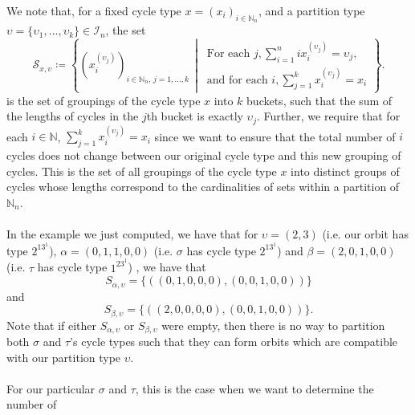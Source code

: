 We note that, for a fixed cycle type \( x = (x_i)_{i \in
\mathbb{N}_n} \), and a partition type $\upsilon =
\{\upsilon_1,\dots, \upsilon_k\}\in\mathcal{I}_n$, the set
\[
  \mathcal{S}_{x,\upsilon} \coloneqq \left\{
    \left(x^{(\upsilon_j)}_i\right)_{i \in \mathbb{N}_n,\, j =
    1,\dots,k} \,\middle|\,
    \begin{array}{l}
      \text{For each } j, \sum_{i=1}^n i x^{(\upsilon_j)}_i = \upsilon_j, \\
      \text{and for each } i, \sum_{j=1}^k x^{(\upsilon_j)}_i = x_i
    \end{array}
  \right\}.
\] is the set of groupings of the cycle type $x$ into $k$ buckets,
such that the sum of the lengths of cycles in the $j$th bucket is
exactly $\upsilon_j$.
Further, we require that for each $i\in\mathbb{N}$, $\sum_{j=1}^k
x^{(\upsilon_j)}_i = x_i$ since we want to ensure that the total number
of $i$ cycles does not change between our original cycle type and
this new grouping of cycles. This is the set of all groupings of the
cycle type $x$ into distinct groups of cycles whose lengths
correspond to the cardinalities of sets within a partition of $\mathbb{N}_n$.
\\\\In the example we just computed, we have that for $\upsilon =
(2,3)$ (i.e. our orbit has type $2^13^1$), $\alpha = (0,1,1,0,0)$
(i.e. $\sigma$ has cycle type $2^13^1$)
and $\beta=(2,0,1,0,0)$ (i.e. $\tau$ has cycle type $1^23^1$) , we have that
\[
  S_{\alpha,\upsilon} = \{((0,1,0,0,0), (0,0,1,0,0))\}
\]
and
\[
  S_{\beta,\upsilon} = \{((2,0,0,0,0), (0, 0, 1,0,0))\}.
\]
Note that if either $S_{\alpha,\upsilon}$ or $S_{\beta,\upsilon}$
were empty, then there is no way to partition both $\sigma$ and
$\tau$'s cycle types such that they can form orbits which are
compatible with our partition type $\upsilon$.
\\\\For our particular $\sigma$
and $\tau$, this is the case when we want to determine the number of
